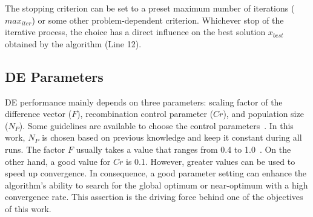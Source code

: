 The stopping criterion can be set to a preset maximum number of iterations ($max_{iter}$) or some other problem-dependent criterion. Whichever stop of the iterative process, the choice has a direct influence on the best solution $x_{best}$ obtained by the algorithm (Line 12). 

\subsection{DE Parameters}

DE performance mainly depends on three parameters: scaling factor of the difference vector ($F$), recombination control parameter ($Cr$), and population size ($N_P$). Some guidelines are available to choose the control parameters~\cite{Price:2005}. In this work, $N_P$ is chosen based on previous knowledge and keep it constant during all runs. The factor $F$ usually takes a value that ranges from 0.4 to 1.0~\cite{Gamperle02aparameter}. On the other hand, a good value for $Cr$ is 0.1. However, greater values can be used to speed up convergence. In consequence,  a good parameter setting can enhance the algorithm's ability to search for the global optimum or near-optimum with a high convergence rate. This assertion is the driving force behind one of the objectives of this work.